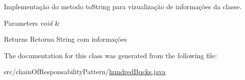 Implementação do metodo to\+String para vizualização de informações da classe. 


\begin{DoxyParams}{Parameters}
{\em void} & \\
\hline
\end{DoxyParams}
\begin{DoxyReturn}{Returns}
Retorna String com informações 
\end{DoxyReturn}


The documentation for this class was generated from the following file\+:\begin{DoxyCompactItemize}
\item 
src/chain\+Of\+Responsability\+Pattern/\mbox{\hyperlink{hundred_bucks_8java}{hundred\+Bucks.\+java}}\end{DoxyCompactItemize}

